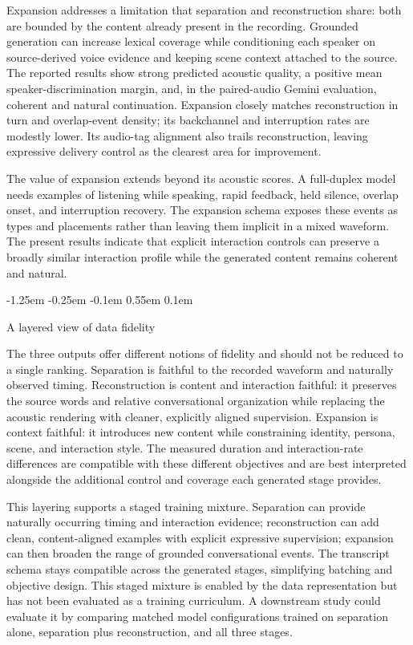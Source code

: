 \documentclass[10pt,twocolumn]{article}
\makeatletter
\renewcommand\subsection{%
  \@startsection{subsection}{2}{\z@}%
    {-1.25em \@plus -0.25em \@minus -0.1em}%
    {0.55em \@plus 0.1em}%
    {\normalfont\fontsize{10.5}{12.5}\selectfont\bfseries\raggedright
     \hyphenpenalty=10000\exhyphenpenalty=10000}}
\makeatother
\begin{document}
Expansion addresses a limitation that separation and reconstruction share: both are bounded by the content already present in the recording. Grounded generation can increase lexical coverage while conditioning each speaker on source-derived voice evidence and keeping scene context attached to the source. The reported results show strong predicted acoustic quality, a positive mean speaker-discrimination margin, and, in the paired-audio Gemini evaluation, coherent and natural continuation. Expansion closely matches reconstruction in turn and overlap-event density; its backchannel and interruption rates are modestly lower. Its audio-tag alignment also trails reconstruction, leaving expressive delivery control as the clearest area for improvement.

The value of expansion extends beyond its acoustic scores. A full-duplex model needs examples of listening while speaking, rapid feedback, held silence, overlap onset, and interruption recovery. The expansion schema exposes these events as types and placements rather than leaving them implicit in a mixed waveform. The present results indicate that explicit interaction controls can preserve a broadly similar interaction profile while the generated content remains coherent and natural.

\subsection{A layered view of data fidelity}

The three outputs offer different notions of fidelity and should not be reduced to a single ranking. Separation is faithful to the recorded waveform and naturally observed timing. Reconstruction is content and interaction faithful: it preserves the source words and relative conversational organization while replacing the acoustic rendering with cleaner, explicitly aligned supervision. Expansion is context faithful: it introduces new content while constraining identity, persona, scene, and interaction style. The measured duration and interaction-rate differences are compatible with these different objectives and are best interpreted alongside the additional control and coverage each generated stage provides.

This layering supports a staged training mixture. Separation can provide naturally occurring timing and interaction evidence; reconstruction can add clean, content-aligned examples with explicit expressive supervision; expansion can then broaden the range of grounded conversational events. The transcript schema stays compatible across the generated stages, simplifying batching and objective design. This staged mixture is enabled by the data representation but has not been evaluated as a training curriculum. A downstream study could evaluate it by comparing matched model configurations trained on separation alone, separation plus reconstruction, and all three stages.
\end{document}
